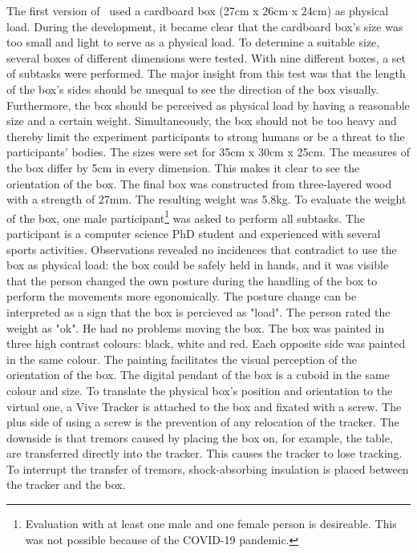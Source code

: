 The first version of \exgo\ used a cardboard box (27cm x 26cm x 24cm) as physical load. During the development, it became clear that the cardboard box's size was too small and light to serve as a physical load. To determine a suitable size, several boxes of different dimensions were tested. With nine different boxes, a set of subtasks were performed. The major insight from this test was that the length of the box's sides should be unequal to see the direction of the box visually. Furthermore, the box should be perceived as physical load by having a reasonable size and a certain weight. Simultaneously, the box should not be too heavy and thereby limit the experiment participants to strong humans or be a threat to the participants' bodies. The sizes were set for 35cm x 30cm x 25cm. The measures of the box differ by 5cm in every dimension. This makes it clear to see the orientation of the box. The final box was constructed from three-layered wood with a strength of 27mm. The resulting weight was 5.8kg. To evaluate the weight of the box, one male participant\footnote{Evaluation with at least one male and one female person is desireable. This was not possible because of the COVID-19 pandemic.} was asked to perform all subtasks. The participant is a computer science PhD student and experienced with several sports activities. Observations revealed no incidences that contradict to use the box as physical load: the box could be safely held in hands, and it was visible that the person changed the own posture during the handling of the box to perform the movements more egonomically. The posture change can be interpreted as a sign that the box is percieved as "load". The person rated the weight as "ok". He had no problems moving the box. The box was painted in three high contrast colours: black, white and red. Each opposite side was painted in the same colour. The painting facilitates the visual perception of the orientation of the box. The digital pendant of the box is a cuboid in the same colour and size. To translate the physical box's position and orientation to the virtual one, a Vive Tracker is attached to the box and fixated with a screw. The plus side of using a screw is the prevention of any relocation of the tracker. The downside is that tremors caused by placing the box on, for example, the table, are transferred directly into the tracker. This causes the tracker to lose tracking. To interrupt the transfer of tremors, shock-absorbing insulation is placed between the tracker and the box.\\
